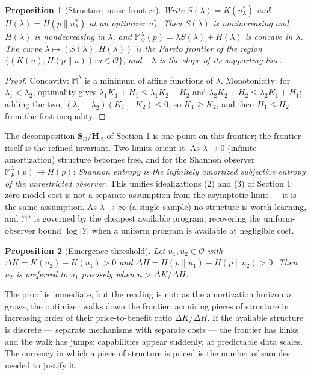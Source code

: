 \documentclass[11pt]{article}
\newtheorem{proposition}{Proposition}
\begin{document}
\begin{proposition}[Structure--noise frontier]\label{prop:frontier}
Write $S(\lambda) = K(u^*_\lambda)$ and $H(\lambda) = H(p \| u^*_\lambda)$ at an optimizer $u^*_\lambda$. Then $S(\lambda)$ is nonincreasing and $H(\lambda)$ is nondecreasing in $\lambda$, and $\mathbb M^\lambda_\mathcal{O}(p) = \lambda S(\lambda) + H(\lambda)$ is concave in $\lambda$. The curve $\lambda \mapsto (S(\lambda), H(\lambda))$ is the Pareto frontier of the region $\{(K(u), H(p\|u)) : u \in \mathcal O\}$, and $-\lambda$ is the slope of its supporting line.
\end{proposition}

\begin{proof}
Concavity: $\mathbb M^\lambda$ is a minimum of affine functions of $\lambda$. Monotonicity: for $\lambda_1 < \lambda_2$, optimality gives $\lambda_1 K_1 + H_1 \leq \lambda_1 K_2 + H_2$ and $\lambda_2 K_2 + H_2 \leq \lambda_2 K_1 + H_1$; adding the two, $(\lambda_1 - \lambda_2)(K_1 - K_2) \leq 0$, so $K_1 \geq K_2$, and then $H_1 \leq H_2$ from the first inequality.
\end{proof}

The decomposition $\mathbf S_\mathcal{O} / \mathbf H_\mathcal{O}$ of Section 1 is one point on this frontier; the frontier itself is the refined invariant. Two limits orient it. As $\lambda \to 0$ (infinite amortization) structure becomes free, and for the Shannon observer $\mathbb M^\lambda_\mathcal{S}(p) \to H(p)$: \emph{Shannon entropy is the infinitely amortized subjective entropy of the unrestricted observer}. This unifies idealizations (2) and (3) of Section 1: zero model cost is not a separate assumption from the asymptotic limit --- it is the same assumption. As $\lambda \to \infty$ (a single sample) no structure is worth learning, and $\mathbb M^\lambda$ is governed by the cheapest available program, recovering the uniform-observer bound $\log|Y|$ when a uniform program is available at negligible cost.

\begin{proposition}[Emergence threshold]\label{prop:threshold}
Let $u_1, u_2 \in \mathcal O$ with $\Delta K = K(u_2) - K(u_1) > 0$ and $\Delta H = H(p\|u_1) - H(p\|u_2) > 0$. Then $u_2$ is preferred to $u_1$ precisely when $n > \Delta K / \Delta H$.
\end{proposition}

The proof is immediate, but the reading is not: as the amortization horizon $n$ grows, the optimizer walks down the frontier, acquiring pieces of structure in increasing order of their price-to-benefit ratio $\Delta K / \Delta H$. If the available structure is discrete --- separate mechanisms with separate costs --- the frontier has kinks and the walk has jumps: capabilities appear suddenly, at predictable data scales. The currency in which a piece of structure is priced is the number of samples needed to justify it.
\end{document}
